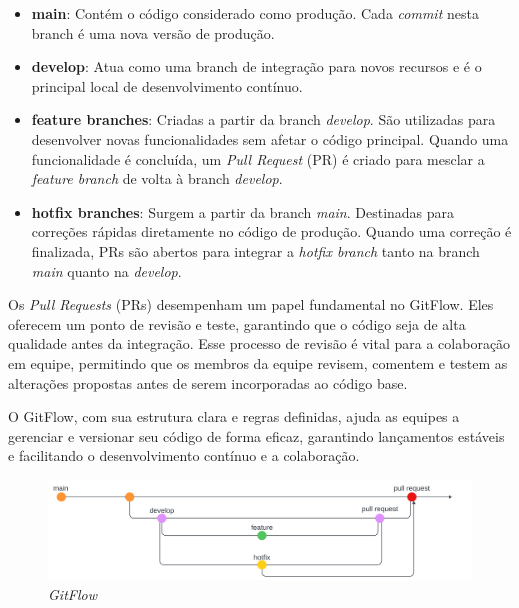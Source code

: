 \begin{itemize}
	\item \textbf{main}: Contém o código considerado como produção. Cada \textit{commit} nesta branch é uma nova versão de produção.

	\item \textbf{develop}: Atua como uma branch de integração para novos recursos e é o principal local de desenvolvimento contínuo.

	\item \textbf{feature branches}: Criadas a partir da branch \textit{develop}. São utilizadas para desenvolver novas funcionalidades sem afetar o código principal. Quando uma funcionalidade é concluída, um \textit{Pull Request} (PR) é criado para mesclar a \textit{feature branch} de volta à branch \textit{develop}.

	\item \textbf{hotfix branches}: Surgem a partir da branch \textit{main}. Destinadas para correções rápidas diretamente no código de produção. Quando uma correção é finalizada, PRs são abertos para integrar a \textit{hotfix branch} tanto na branch \textit{main} quanto na \textit{develop}.
\end{itemize}

Os \textit{Pull Requests} (PRs) desempenham um papel fundamental no GitFlow. Eles oferecem um ponto de revisão e teste, garantindo que o código seja de alta qualidade antes da integração. Esse processo de revisão é vital para a colaboração em equipe, permitindo que os membros da equipe revisem, comentem e testem as alterações propostas antes de serem incorporadas ao código base.

O GitFlow, com sua estrutura clara e regras definidas, ajuda as equipes a gerenciar e versionar seu código de forma eficaz, garantindo lançamentos estáveis e facilitando o desenvolvimento contínuo e a colaboração.

\begin{figure}[ht]
	\centering
	\includegraphics[width=1\linewidth]{Textuais/gitflow.png}
	\caption{\textit{GitFlow}}
	\label{fig:enter-label}
\end{figure}

